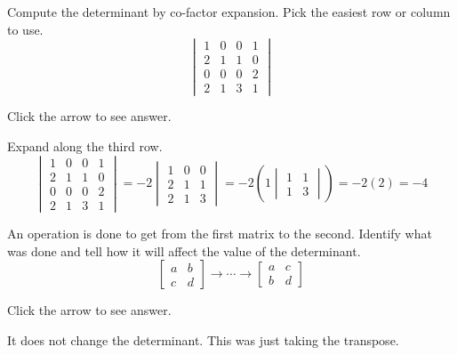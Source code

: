 \documentclass{ximera}
\begin{document}
\begin{problem}\label{prb:7.7} Compute the determinant by co-factor expansion. Pick the easiest row or
column to use.
$$\begin{vmatrix}
1 & 0 & 0 & 1 \\
2 & 1 & 1 & 0 \\
0 & 0 & 0 & 2 \\
2 & 1 & 3 & 1
\end{vmatrix}$$

Click the arrow to see answer.
\begin{expandable}{}{}
Expand along the third row.
$$\begin{vmatrix}
1 & 0 & 0 & 1 \\
2 & 1 & 1 & 0 \\
0 & 0 & 0 & 2 \\
2 & 1 & 3 & 1
\end{vmatrix}=-2\begin{vmatrix}
    1 & 0 & 0\\2 & 1 & 1\\2 & 1 & 3
\end{vmatrix}=-2\left(1\begin{vmatrix}
    1 & 1\\1 & 3
\end{vmatrix}\right)=-2(2)=-4$$
\end{expandable}
\end{problem}

\begin{problem}\label{prb:7.9} An operation is done to get from the first matrix to the second.
Identify what was done and tell how it will affect the value of the
determinant.
\begin{equation*}
\left[
\begin{array}{cc}
a & b \\
c & d
\end{array}
\right]  \rightarrow \cdots \rightarrow \left[
\begin{array}{cc}
a & c \\
b & d
\end{array}
\right]
\end{equation*}

Click the arrow to see answer.
\begin{expandable}{}{}
It does not change the determinant. This was just taking the transpose.
\end{expandable}
\end{problem}
\end{document}
